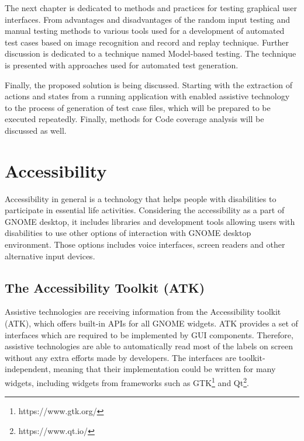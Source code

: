 The next chapter is dedicated to methods and practices for testing graphical user interfaces. From advantages and disadvantages of the random input testing and manual testing methods to various tools used for a development of automated test cases based on image recognition and record and replay technique. Further discussion is dedicated to a technique named Model-based testing. The technique is presented with approaches used for automated test generation. 

Finally, the proposed solution is being discussed. Starting with the extraction of actions and states from a running application with enabled assistive technology to the process of generation of test case files, which will be prepared to be executed repeatedly. Finally, methods for Code coverage analysis will be discussed as well. 

\chapter{Accessibility}
Accessibility in general is a technology that helps people with disabilities to participate in essential life activities. Considering the accessibility as a part of GNOME desktop, it includes libraries and development tools allowing users with disabilities to use other options of interaction with GNOME desktop environment. Those options includes voice interfaces, screen readers and other alternative input devices.\cite{gnomeADG}
\section{The Accessibility Toolkit (ATK)}
Assistive technologies are receiving information from the Accessibility toolkit (ATK), which offers built-in APIs for all GNOME widgets. ATK provides a set of interfaces which are required to be implemented by GUI components. Therefore, assistive technologies are able to automatically read most of the labels on screen without any extra efforts made by developers. The interfaces are toolkit-independent, meaning that their implementation could be written for many widgets, including widgets from frameworks such as GTK\footnote{https://www.gtk.org/} and Qt\footnote{https://www.qt.io/}.
